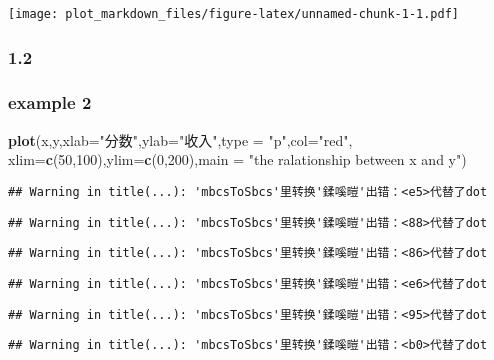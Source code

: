 \documentclass[]{article}
\newenvironment{Shaded}{\begin{snugshade}}{\end{snugshade}}
\newcommand{\KeywordTok}[1]{\textcolor[rgb]{0.13,0.29,0.53}{\textbf{#1}}}
\newcommand{\DataTypeTok}[1]{\textcolor[rgb]{0.13,0.29,0.53}{#1}}
\newcommand{\DecValTok}[1]{\textcolor[rgb]{0.00,0.00,0.81}{#1}}
\newcommand{\StringTok}[1]{\textcolor[rgb]{0.31,0.60,0.02}{#1}}
\newcommand{\NormalTok}[1]{#1}
\begin{document}
\texttt{[image: plot\_markdown\_files/figure-latex/unnamed-chunk-1-1.pdf]}

\subsubsection{1.2}\label{section-1}

\subsubsection{example 2}\label{example-2}

\begin{Shaded}
\begin{Highlighting}[]
\KeywordTok{plot}\NormalTok{(x,y,}\DataTypeTok{xlab=}\StringTok{"分数"}\NormalTok{,}\DataTypeTok{ylab=}\StringTok{"收入"}\NormalTok{,}\DataTypeTok{type =} \StringTok{"p"}\NormalTok{,}\DataTypeTok{col=}\StringTok{"red"}\NormalTok{,}
     \DataTypeTok{xlim=}\KeywordTok{c}\NormalTok{(}\DecValTok{50}\NormalTok{,}\DecValTok{100}\NormalTok{),}\DataTypeTok{ylim=}\KeywordTok{c}\NormalTok{(}\DecValTok{0}\NormalTok{,}\DecValTok{200}\NormalTok{),}\DataTypeTok{main =} \StringTok{"the ralationship between x and y"}\NormalTok{)}
\end{Highlighting}
\end{Shaded}

\begin{verbatim}
## Warning in title(...): 'mbcsToSbcs'里转换'鍒嗘暟'出错：<e5>代替了dot
\end{verbatim}

\begin{verbatim}
## Warning in title(...): 'mbcsToSbcs'里转换'鍒嗘暟'出错：<88>代替了dot
\end{verbatim}

\begin{verbatim}
## Warning in title(...): 'mbcsToSbcs'里转换'鍒嗘暟'出错：<86>代替了dot
\end{verbatim}

\begin{verbatim}
## Warning in title(...): 'mbcsToSbcs'里转换'鍒嗘暟'出错：<e6>代替了dot
\end{verbatim}

\begin{verbatim}
## Warning in title(...): 'mbcsToSbcs'里转换'鍒嗘暟'出错：<95>代替了dot
\end{verbatim}

\begin{verbatim}
## Warning in title(...): 'mbcsToSbcs'里转换'鍒嗘暟'出错：<b0>代替了dot
\end{verbatim}
\end{document}
